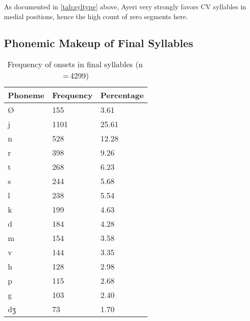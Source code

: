 As documented in \autoref{tab:syltype} above, Ayeri very strongly favors CV 
syllables in medial positions, hence the high count of zero segments here.

\subsection{Phonemic Makeup of Final Syllables}

\begin{table}[pth]\centering
\caption[Frequency of onsets in final syllables]{Frequency of onsets in final syllables (n\,=\,4299)}
\setlength{\multicolsep}{0em}
\begin{multicols}{2}
\begin{tabu} to \linewidth{X X[c] X[c]}
\tableheaderfont\toprule
Phoneme
	& Frequency
	& Percentage
	\\
	
\toprule

Ø
	& 155
	& 3.61\pct
	\\

\midrule

j
	& 1101
	& 25.61\pct
	\\

n
	& 528
	& 12.28\pct
	\\

r
	& 398
	& 9.26\pct
	\\

t
	& 268
	& 6.23\pct
	\\

s
	& 244
	& 5.68\pct
	\\

l
	& 238
	& 5.54\pct
	\\

k
	& 199
	& 4.63\pct
	\\

d
	& 184
	& 4.28\pct
	\\

m
	& 154
	& 3.58\pct
	\\

v
	& 144
	& 3.35\pct
	\\

h
	& 128
	& 2.98\pct
	\\

p
	& 115
	& 2.68\pct
	\\

g
	& 103
	& 2.40\pct
	\\

dʒ
	& 73
	& 1.70\pct
	\\


\end{tabu}
\end{multicols}
\end{table}
